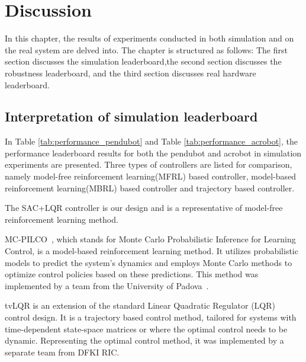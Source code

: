 \chapter{Discussion}
In this chapter, the results of experiments conducted in both simulation and on the real system are delved into. The chapter is structured as follows: The first section discusses the simulation leaderboard,the second section discusses the robustness leaderboard, and the third section discusses real hardware leaderboard. 

\section{Interpretation of simulation leaderboard}
In Table \ref{tab:performance_pendubot} and Table \ref{tab:performance_acrobot}, the performance leaderboard results for both the pendubot and acrobot in simulation experiments are presented. Three types of controllers are listed for comparison, namely model-free reinforcement learning(MFRL) based controller, model-based reinforcement learning(MBRL) based controller and trajectory based controller.

The SAC+LQR controller is our design and is a representative of model-free reinforcement learning method. 

MC-PILCO~\cite{amadio2022model}, which stands for Monte Carlo Probabilistic Inference for Learning Control, is a model-based reinforcement learning method. It utilizes probabilistic models to predict the system's dynamics and employs Monte Carlo methods to optimize control policies based on these predictions. This method was implemented by a team from the University of Padova~\cite{Libera2023AthleticIO}. 

tvLQR is an extension of the standard Linear Quadratic Regulator (LQR) control design. It is a trajectory based control method, tailored for systems with time-dependent state-space matrices or where the optimal control needs to be dynamic. Representing the optimal control method, it was implemented by a separate team from DFKI RIC\cite{2023_ram_wiebe_double_pendulum}.

